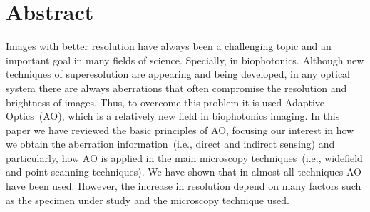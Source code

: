 \section*{Abstract}

Images with better resolution have always been a challenging topic and an important goal in many fields of science. Specially, in biophotonics. Although new techniques of superesolution are appearing and being developed, in any optical system there are always aberrations that often compromise the resolution and brightness of images. Thus, to overcome this problem it is used Adaptive Optics~(AO), which is a relatively new field in biophotonics imaging. In this paper we have reviewed the basic principles of AO, focusing our interest in how we obtain the aberration information~(i.e., direct and indirect sensing) and particularly, how AO is applied in the main microscopy techniques~(i.e., widefield and point scanning techniques). We have shown that in almost all techniques AO have been used. However, the increase in resolution depend on many factors such as the specimen under study and the microscopy technique used. 
  
